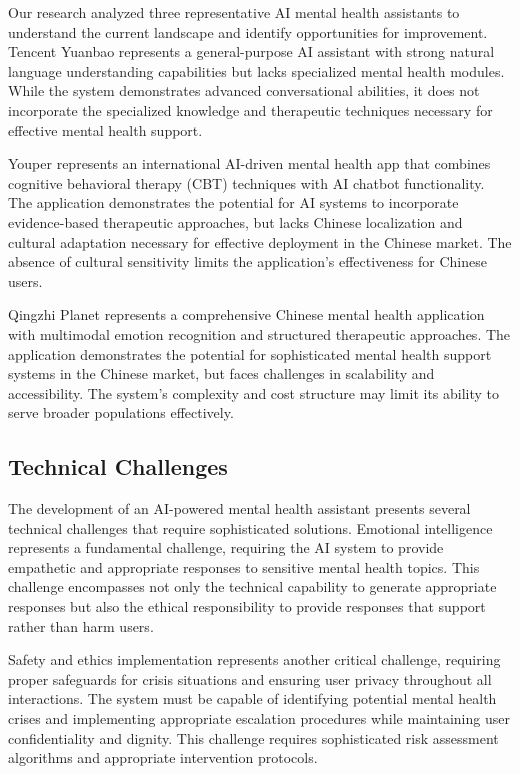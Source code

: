 Our research analyzed three representative AI mental health assistants to understand the current landscape and identify opportunities for improvement. Tencent Yuanbao represents a general-purpose AI assistant with strong natural language understanding capabilities but lacks specialized mental health modules. While the system demonstrates advanced conversational abilities, it does not incorporate the specialized knowledge and therapeutic techniques necessary for effective mental health support.

Youper represents an international AI-driven mental health app that combines cognitive behavioral therapy (CBT) techniques with AI chatbot functionality. The application demonstrates the potential for AI systems to incorporate evidence-based therapeutic approaches, but lacks Chinese localization and cultural adaptation necessary for effective deployment in the Chinese market. The absence of cultural sensitivity limits the application's effectiveness for Chinese users.

Qingzhi Planet represents a comprehensive Chinese mental health application with multimodal emotion recognition and structured therapeutic approaches. The application demonstrates the potential for sophisticated mental health support systems in the Chinese market, but faces challenges in scalability and accessibility. The system's complexity and cost structure may limit its ability to serve broader populations effectively.

\subsection{Technical Challenges}

The development of an AI-powered mental health assistant presents several technical challenges that require sophisticated solutions. Emotional intelligence represents a fundamental challenge, requiring the AI system to provide empathetic and appropriate responses to sensitive mental health topics. This challenge encompasses not only the technical capability to generate appropriate responses but also the ethical responsibility to provide responses that support rather than harm users.

Safety and ethics implementation represents another critical challenge, requiring proper safeguards for crisis situations and ensuring user privacy throughout all interactions. The system must be capable of identifying potential mental health crises and implementing appropriate escalation procedures while maintaining user confidentiality and dignity. This challenge requires sophisticated risk assessment algorithms and appropriate intervention protocols.

